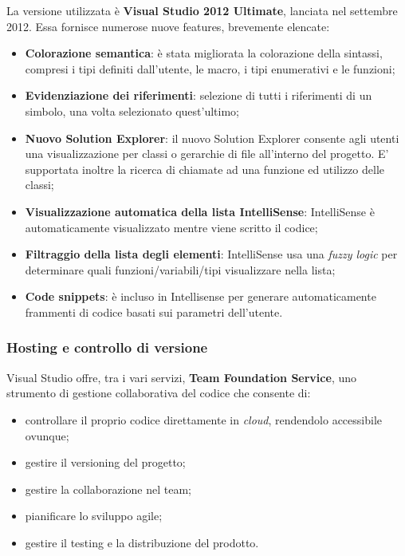 La versione utilizzata è \textbf{Visual Studio 2012 Ultimate}, lanciata nel settembre 2012.
Essa fornisce numerose nuove features, brevemente elencate:
\begin{itemize}
\item \textbf{Colorazione semantica}: è stata migliorata la colorazione della sintassi, compresi i tipi definiti dall'utente, le macro, i tipi enumerativi e le funzioni;
\item \textbf{Evidenziazione dei riferimenti}: selezione di tutti i riferimenti di un simbolo, una volta selezionato quest'ultimo;
\item \textbf{Nuovo Solution Explorer}: il nuovo Solution Explorer consente agli utenti una visualizzazione per classi o gerarchie di file all'interno del progetto.
E' supportata inoltre la ricerca di chiamate ad una funzione ed utilizzo delle classi;
\item \textbf{Visualizzazione automatica della lista IntelliSense}: IntelliSense è automaticamente visualizzato mentre viene scritto il codice;
\item \textbf{Filtraggio della lista degli elementi}: IntelliSense usa una \textit{fuzzy logic} per determinare quali funzioni/variabili/tipi visualizzare nella lista;
\item \textbf{Code snippets}: è incluso in Intellisense per generare automaticamente frammenti di codice basati sui parametri dell'utente.
\end{itemize}

\subsubsection{Hosting e controllo di versione}
Visual Studio offre, tra i vari servizi, \textbf{Team Foundation Service}, uno strumento di gestione collaborativa del codice che consente di:
\begin{itemize}
\item controllare il proprio codice direttamente in \textit{cloud}, rendendolo accessibile ovunque;
\item gestire il versioning del progetto;
\item gestire la collaborazione nel team;
\item pianificare lo sviluppo agile;
\item gestire il testing e la distribuzione del prodotto.
\end{itemize}



\clearpage{\pagestyle{empty}\cleardoublepage}